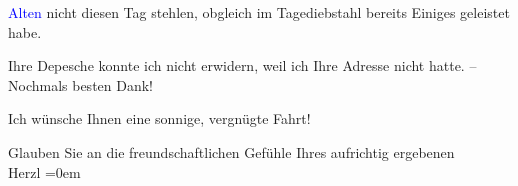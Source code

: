                   \textcolor{blue}{Alten}\ledrightnote{\textcolor{blue}{Jeanette Herzl}{\newline}\textcolor{blue}{Jakob Herzl}} nicht diesen Tag stehlen,
               obgleich im Tagediebstahl bereits Einiges geleistet habe.\pend
           
\pstart
           Ihre Depesche konnte ich nicht erwidern, weil ich Ihre Adresse nicht hatte. –
               Nochmals besten Dank!\pend
           
\pstart
           Ich wünsche Ihnen eine sonnige, vergnügte Fahrt!\pend
           
\pstart
           Glauben Sie an die freundschaftlichen Gefühle Ihres aufrichtig ergebenen{\\[\baselineskip]}\spacefill\mbox{Herzl}\pend
           \leftskip=0em{}\endnumbering{}  \newcommand{\dateiname}{L03821}\newcommand{\titel}{Theodor Herzl an Arthur Schnitzler, 14. 8. 1885}\newcommand{\editorInnen}{Selma Jahnke und Martin Anton Müller}
